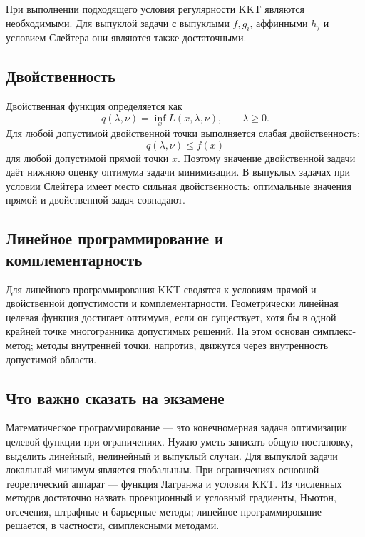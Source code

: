 При выполнении подходящего условия регулярности KKT являются необходимыми. Для
выпуклой задачи с выпуклыми $f,g_i$, аффинными $h_j$ и условием Слейтера они
являются также достаточными.

\subsection{Двойственность}

Двойственная функция определяется как
\[
    q(\lambda,\nu)=\inf_x L(x,\lambda,\nu),\qquad \lambda\ge0.
\]
Для любой допустимой двойственной точки выполняется слабая двойственность:
\[
    q(\lambda,\nu)\le f(x)
\]
для любой допустимой прямой точки $x$. Поэтому значение двойственной задачи даёт
нижнюю оценку оптимума задачи минимизации. В выпуклых задачах при условии Слейтера
имеет место сильная двойственность: оптимальные значения прямой и двойственной
задач совпадают.

\subsection{Линейное программирование и комплементарность}

Для линейного программирования KKT сводятся к условиям прямой и двойственной
допустимости и комплементарности. Геометрически линейная целевая функция достигает
оптимума, если он существует, хотя бы в одной крайней точке многогранника
допустимых решений. На этом основан симплекс-метод; методы внутренней точки, напротив,
движутся через внутренность допустимой области.

\subsection{Что важно сказать на экзамене}

Математическое программирование --- это конечномерная задача оптимизации
целевой функции при ограничениях. Нужно уметь записать общую постановку,
выделить линейный, нелинейный и выпуклый случаи. Для выпуклой задачи локальный
минимум является глобальным. При ограничениях основной теоретический аппарат ---
функция Лагранжа и условия KKT. Из численных методов достаточно назвать
проекционный и условный градиенты, Ньютон, отсечения, штрафные и барьерные
методы; линейное программирование решается, в частности, симплексными методами.

\newpage
